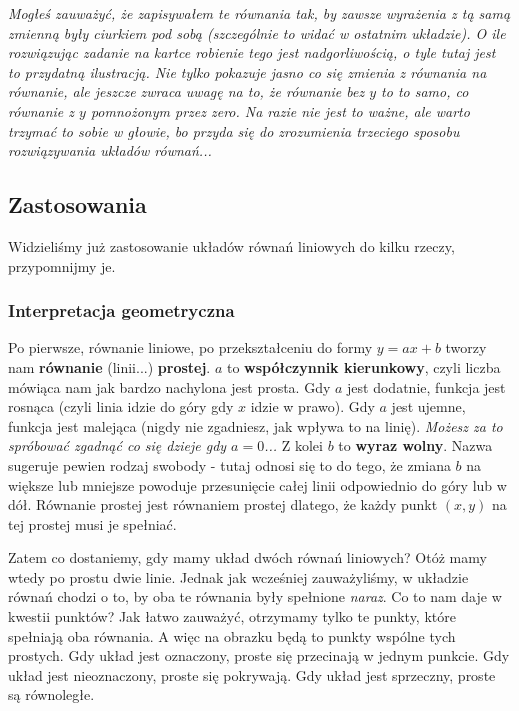 \documentclass{article}
\theoremstyle{remark}
\begin{document}
\textit{Mogłeś zauważyć, że zapisywałem te równania tak, by zawsze wyrażenia z tą samą zmienną
były ciurkiem pod sobą (szczególnie to widać w ostatnim układzie). O ile rozwiązując
zadanie na kartce robienie tego jest nadgorliwością, o tyle tutaj jest to przydatną
ilustracją. Nie tylko pokazuje jasno co się zmienia z równania na równanie, ale jeszcze
zwraca uwagę na to, że równanie bez $y$ to to samo, co równanie z $y$ pomnożonym
przez zero. Na razie nie jest to ważne, ale warto trzymać to sobie w głowie, bo
przyda się do zrozumienia trzeciego sposobu rozwiązywania układów równań...}

\subsection{Zastosowania}
Widzieliśmy już zastosowanie układów równań liniowych do kilku rzeczy, przypomnijmy je.

\subsubsection{Interpretacja geometryczna}
Po pierwsze, równanie liniowe, po przekształceniu do formy $y=ax+b$ tworzy
nam \textbf{równanie} (linii...) \textbf{prostej}. 
$a$ to \textbf{współczynnik kierunkowy}, czyli
liczba mówiąca nam jak bardzo nachylona jest prosta. Gdy $a$ jest dodatnie, funkcja jest
rosnąca (czyli linia idzie do góry gdy $x$ idzie w prawo). Gdy $a$ jest ujemne,
funkcja jest malejąca (nigdy nie zgadniesz, jak wpływa to na linię). \textit{Możesz
za to spróbować zgadnąć co się dzieje gdy $a=0$...} Z kolei $b$ to \textbf{wyraz wolny}.
Nazwa sugeruje pewien rodzaj swobody - tutaj odnosi się to do tego, że zmiana $b$ na
większe lub mniejsze powoduje przesunięcie całej linii odpowiednio do góry lub w dół.
Równanie prostej jest równaniem prostej dlatego, że każdy punkt $(x, y)$ na tej prostej
musi je spełniać.

Zatem co dostaniemy, gdy mamy układ dwóch równań liniowych? Otóż mamy wtedy po prostu dwie
linie. Jednak jak wcześniej zauważyliśmy, w układzie równań chodzi o to, by oba te
równania były spełnione \textit{naraz}. Co to nam daje w kwestii punktów? Jak łatwo
zauważyć, otrzymamy tylko te punkty, które spełniają oba równania. A więc na obrazku
będą to punkty wspólne tych prostych.
\subitem Gdy układ jest oznaczony, proste się przecinają w jednym punkcie.
\subitem Gdy układ jest nieoznaczony, proste się pokrywają.
\subitem Gdy układ jest sprzeczny, proste są równoległe.
\end{document}
